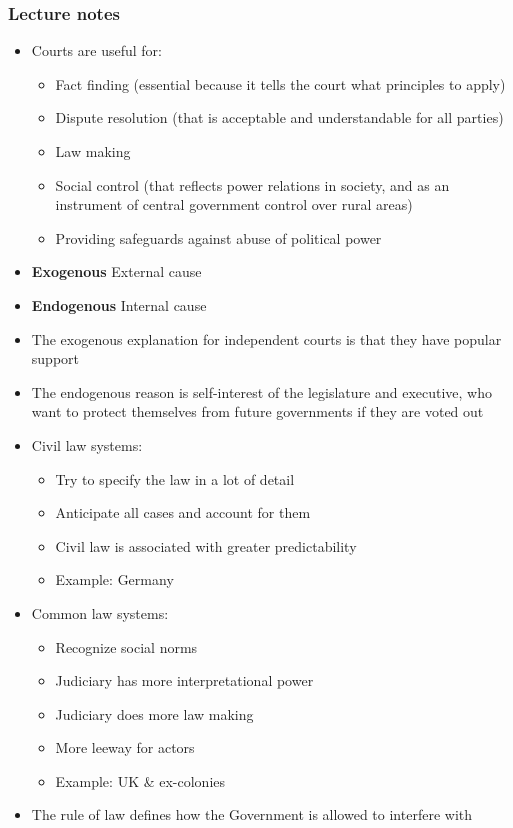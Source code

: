 \documentclass[11pt]{article}
\begin{document}
\subsubsection{Lecture notes}
\label{sec:org44d1df6}
\begin{itemize}
\item Courts are useful for:
\begin{itemize}
\item Fact finding (essential because it tells the court what principles to apply)
\item Dispute resolution (that is acceptable and understandable for all parties)
\item Law making
\item Social control (that reflects power relations in society, and as an
instrument of central government control over rural areas)
\item Providing safeguards against abuse of political power
\end{itemize}
\item \textbf{Exogenous} External cause
\item \textbf{Endogenous} Internal cause
\item The exogenous explanation for independent courts is that they have popular
support
\item The endogenous reason is self-interest of the legislature and executive, who
want to protect themselves from future governments if they are voted out
\item Civil law systems:
\begin{itemize}
\item Try to specify the law in a lot of detail
\item Anticipate all cases and account for them
\item Civil law is associated with greater predictability
\item Example: Germany
\end{itemize}
\item Common law systems:
\begin{itemize}
\item Recognize social norms
\item Judiciary has more interpretational power
\item Judiciary does more law making
\item More leeway for actors
\item Example: UK \& ex-colonies
\end{itemize}
\item The rule of law defines how the Government is allowed to interfere with

\end{itemize}
\end{document}
